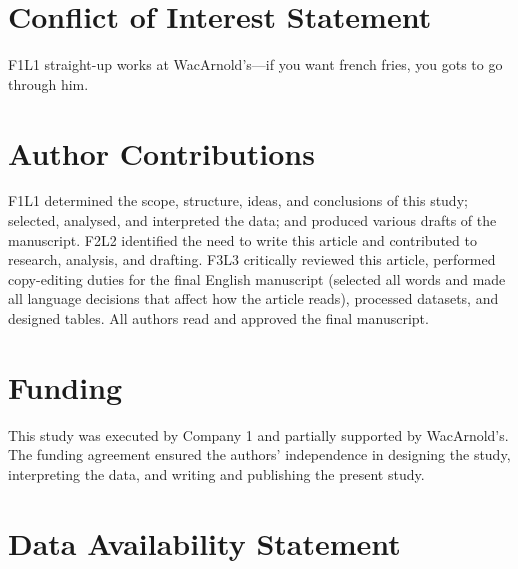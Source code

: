 \documentclass[utf8]{test_class}
\begin{document}
\section*{Conflict of Interest Statement}

F1L1 straight-up works at WacArnold's---if you want french fries, you gots to go through him.

\section*{Author Contributions}

F1L1 determined the scope, structure, ideas, and conclusions of this study; selected, analysed, and
interpreted the data; and produced various drafts of the manuscript. F2L2 identified the need to
write this article and contributed to research, analysis, and drafting. F3L3 critically reviewed
this article, performed copy-editing duties for the final English manuscript (selected all words
and made all language decisions that affect how the article reads), processed datasets, and
designed tables. All authors read and approved the final manuscript.

\section*{Funding}

This study was executed by Company 1 and partially supported by WacArnold's. 
The funding agreement ensured the authors' independence in designing the study, interpreting the
data, and writing and publishing the present study.



\section*{Data Availability Statement}
\end{document}
